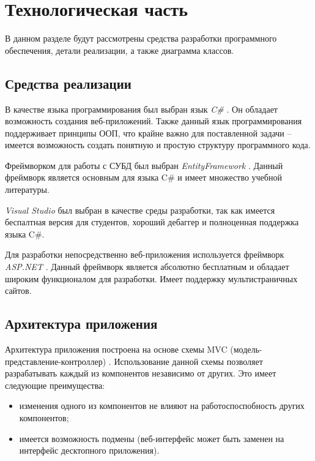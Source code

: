 \chapter{Технологическая часть}

В данном разделе будут рассмотрены средства разработки программного обеспечения, детали реализации, а также диаграмма классов.


\section{Средства реализации}

В качестве языка программирования был выбран язык \textit{C\#} \cite{csharp}. Он обладает возможность создания веб-приложений. Также данный язык программирования поддерживает принципы ООП, что крайне важно для поставленной задачи -- имеется возможность создать понятную и простую структуру программного кода.

Фреймворком для работы с СУБД был выбран \textit{EntityFramework} \cite{ef}. Данный фреймворк является основным для языка C\# и имеет множество учебной литературы.

\textit{Visual Studio} \cite{vs} был выбран в качестве среды разработки, так как имеется беспалтная версия для студентов, хороший дебаггер и полноценная поддержка языка C\#. 

Для разработки непосредственно веб-приложения используется фреймворк \textit{ASP.NET} \cite{asp}. Данный фреймворк является абсолютно бесплатным и обладает широким функционалом для разработки. Имеет поддержку мультистраничных сайтов.


\section{Архитектура приложения}

Архитектура приложения построена на основе схемы MVC (модель-представление-контроллер) \cite{mvc}. Использование данной схемы позволяет разрабатывать каждый из компонентов независимо от других. Это имеет следующие преимущества:

\begin{itemize}
    \item изменения одного из компонентов не влияют на работоспоспобность других компонентов;
    \item имеется возможность подмены (веб-интерфейс может быть заменен на интерфейс десктопного приложения).
\end{itemize}

